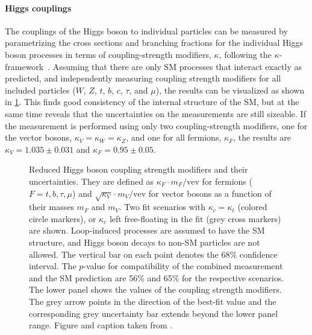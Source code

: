 \paragraph{Higgs couplings}
The couplings of the Higgs boson to individual particles can be measured by parametrizing the cross sections and branching fractions for the individual Higgs boson processes in terms of coupling-strength modifiers, $\kappa$, following the $\kappa$-framework~\cite{LHCHandbookV3}. 
Assuming that there are only SM processes that interact exactly as predicted, and independently measuring coupling strength modifiers for all included particles ($W$, $Z$, $t$, $b$, $c$, $\tau$, and $\mu$), the results can be visualized as shown in \cref{fig:h-couplings}. 
This finds good consistency of the internal structure of the SM, but at the same time reveals that the uncertainties on the measurements are still sizeable. 
If the measurement is performed using only two coupling-strength modifiers, one for the vector bosons, $\kappa_V = \kappa_W = \kappa_Z$, and one for all fermions, $\kappa_F$, the results are $\kappa_V = 1.035 \pm 0.031$ and $\kappa_F = 0.95 \pm 0.05$. 

\begin{figure}
  \caption{
    Reduced Higgs boson coupling strength modifiers and their uncertainties. They are defined as $\kappa_F \cdot m_F / \text{vev}$ for fermions
($F=t,b,\tau,\mu$) and $\sqrt{\kappa_V}\cdot m_V/\text{vev}$ for vector bosons as a
function of their masses $m_F$ and $m_V$. Two fit scenarios with $\kappa_c =
\kappa_t$ (colored circle markers), or $\kappa_c$ left free-floating in the fit (grey
cross markers) are shown. Loop-induced processes are assumed to have the SM structure, and Higgs boson decays to non-SM particles are not allowed. The vertical bar on each point denotes the 68\% confidence interval. The $p$-value for compatibility of the combined measurement and the SM prediction are 56\% and 65\% for the respective scenarios. The lower panel shows the values of the coupling strength modifiers. The grey arrow points in the direction of the best-fit value and the corresponding grey uncertainty bar extends beyond the lower panel range. Figure and caption taken from .}
  \label{fig:h-couplings}
\end{figure}

